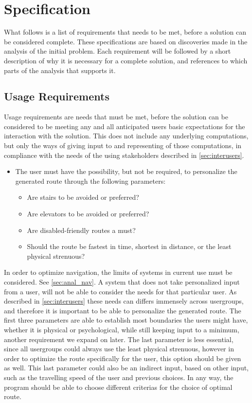 \section{Specification} %
\label{sec:specification}

What follows is a list of requirements that needs to be met, before a solution can be considered complete. These specifications are based on discoveries made in the analysis of the initial problem. Each requirement will be followed by a short description of why it is necessary for a complete solution, and references to which parts of the analysis that supports it.

\subsection{Usage Requirements}

Usage requirements are needs that must be met, before the solution can be considered to be meeting any and all anticipated users basic expectations for the interaction with the solution. This does not include any underlying computations, but only the ways of giving input to and representing of those computations, in compliance with the needs of the using stakeholders described in \cref{sec:interusers}.

\begin{itemize}
	\item The user must have the possibility, but not be required, to personalize the generated route through the following parameters:
			\begin{itemize}
				\item Are stairs to be avoided or preferred?
				\item Are elevators to be avoided or preferred?
				\item Are disabled-friendly routes a must?
				\item Should the route be fastest in time, shortest in distance, or the least physical strenuous?
			\end{itemize}
\end{itemize}
In order to optimize navigation, the limits of systems in current use must be considered. See \cref{sec:anal_nav}. A system that does not take personalized input from a user, will not be able to consider the needs for that particular user. As described in \cref{sec:interusers} these needs can differs immensely across usergroups, and therefore it is important to be able to personalize the generated route.
The first three parameters are able to establish most boundaries the users might have, whether it is physical or psychological, while still keeping input to a minimum, another requirement we expand on later. The last parameter is less essential, since all usergroups could always use the least physical strenuous, however in order to optimize the route specifically for the user, this option should be given as well. This last parameter could also be an indirect input, based on other input, such as the travelling speed of the user and previous choices. In any way, the program should be able to choose different criterias for the choice of optimal route.

